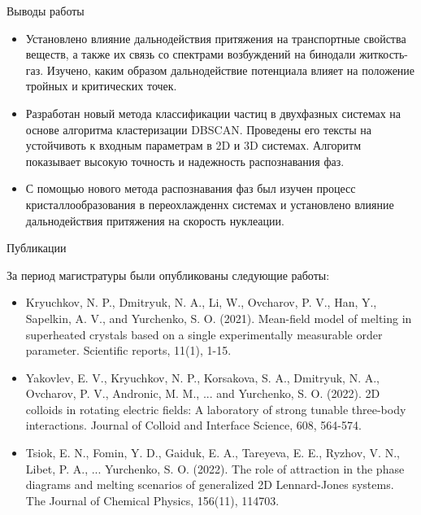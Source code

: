 \documentclass{beamer}
\begin{document}
\begin{frame}{Выводы работы}
\footnotesize{
\begin{itemize}

    \item Установлено влияние дальнодействия притяжения на транспортные свойства веществ, а также их связь со спектрами возбуждений на бинодали житкость-газ. Изучено, каким образом дальнодействие потенциала влияет на положение тройных и критических точек.

    \item Разработан новый метода классификации частиц в двухфазных системах на основе алгоритма кластеризации DBSCAN. Проведены его тексты на устойчивоть к входным параметрам в 2D и 3D системах. Алгоритм показывает высокую точность и надежность распознавания фаз.

    \item С помощью нового метода распознавания фаз был изучен процесс кристаллообразования в переохлажденнх системах и установлено влияние дальнодействия притяжения на скорость нуклеации.

\end{itemize}


}
\end{frame}









\begin{frame}{Публикации}
\footnotesize{

За период магистратуры были опубликованы следующие работы:

\begin{itemize}
    \item Kryuchkov, N. P., Dmitryuk, N. A., Li, W., Ovcharov, P. V., Han, Y., Sapelkin, A. V., and Yurchenko, S. O. (2021). Mean-field model of melting in superheated crystals based on a single experimentally measurable order parameter. Scientific reports, 11(1), 1-15.
    \item Yakovlev, E. V., Kryuchkov, N. P., Korsakova, S. A., Dmitryuk, N. A., Ovcharov, P. V., Andronic, M. M., ... and Yurchenko, S. O. (2022). 2D colloids in rotating electric fields: A laboratory of strong tunable three-body interactions. Journal of Colloid and Interface Science, 608, 564-574.
    \item Tsiok, E. N., Fomin, Y. D., Gaiduk, E. A., Tareyeva, E. E., Ryzhov, V. N., Libet, P. A., ... Yurchenko, S. O. (2022). The role of attraction in the phase diagrams and melting scenarios of generalized 2D Lennard-Jones systems. The Journal of Chemical Physics, 156(11), 114703.
\end{itemize}


}
\end{frame}
\end{document}
